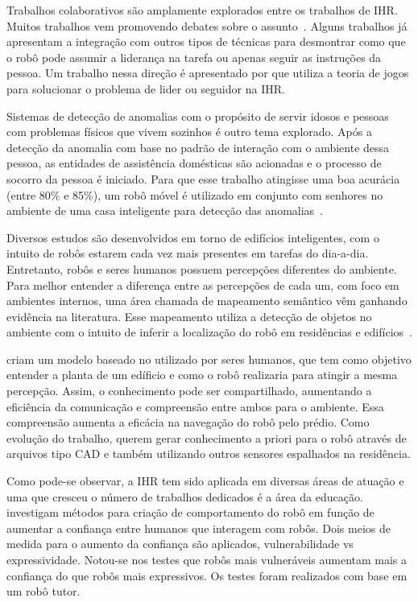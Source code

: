 Trabalhos colaborativos são amplamente explorados entre os trabalhos de IHR. Muitos trabalhos vem promovendo debates sobre o assunto~\cite{strohkorb:2016,lampe:2016}. Alguns trabalhos já apresentam a integração com outros tipos de técnicas para desmontrar como que o robô pode assumir a liderança na tarefa ou apenas seguir as instruções da pessoa. Um trabalho nessa direção é apresentado por  que utiliza a teoria de jogos para solucionar o problema de lider ou seguidor na IHR.

Sistemas de detecção de anomalias com o propósito de servir idosos e pessoas com problemas físicos que vivem sozinhos é outro tema explorado. Após a detecção da anomalia com base no padrão de interação com o ambiente dessa pessoa, as entidades de assistência domésticas são acionadas e o processo de socorro da pessoa é iniciado. Para que esse trabalho atingisse uma boa acurácia (entre 80\% e 85\%), um robô móvel é utilizado em conjunto com senhores no ambiente de uma casa inteligente para detecção das anomalias~\cite{lundstrom:2015}.

Diversos estudos são desenvolvidos em torno de edifícios inteligentes, com o intuito de robôs estarem cada vez mais presentes em tarefas do dia-a-dia. Entretanto, robôs e seres humanos possuem percepções diferentes do ambiente. Para melhor entender a diferença entre as percepções de cada um, com foco em ambientes internos, uma área chamada de mapeamento semântico vêm ganhando evidência na literatura. Esse mapeamento utiliza a detecção de objetos no ambiente com o intuito de inferir a localização do robô em residências e edifícios~\cite{turek:2017}.

 criam um modelo baseado no utilizado por seres humanos, que tem como objetivo entender a planta de um edíficio e como o robô realizaria para atingir a mesma percepção. Assim, o conhecimento pode ser compartilhado, aumentando a eficiência da comunicação e compreensão entre ambos para o ambiente. Essa compreensão aumenta a eficácia na navegação do robô pelo prédio. Como evolução do trabalho,  querem gerar conhecimento a priori para o robô através de arquivos tipo CAD e também utilizando outros sensores espalhados na residência.

Como pode-se observar, a IHR tem sido aplicada em diversas áreas de atuação e uma que cresceu o número de trabalhos dedicados é a área da educação.  investigam métodos para criação de comportamento do robô em função de aumentar a confiança entre humanos que interagem com robôs. Dois meios de medida para o aumento da confiança são aplicados, vulnerabilidade vs expressividade. Notou-se nos testes que robôs mais vulneráveis aumentam mais a confiança do que robôs mais expressivos. Os testes foram realizados com base em um robô tutor.

